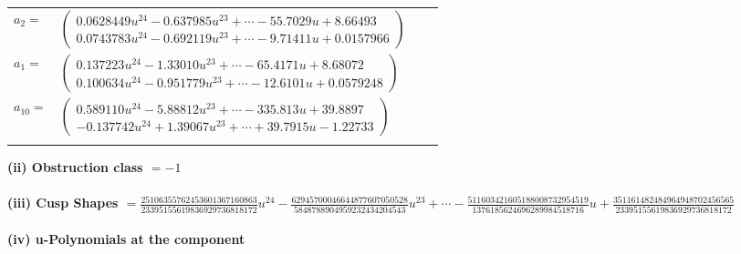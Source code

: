 \documentclass[1p]{elsarticle_modified}
\theoremstyle{definition}
\begin{document}
\begin{tabular}{m{7pt} m{180pt} m{7pt} m{180pt} }
\flushright $a_{2}=$&$\begin{pmatrix}0.0628449 u^{24}-0.637985 u^{23}+\cdots-55.7029 u+8.66493\\0.0743783 u^{24}-0.692119 u^{23}+\cdots-9.71411 u+0.0157966\end{pmatrix}$ \\
\flushright $a_{1}=$&$\begin{pmatrix}0.137223 u^{24}-1.33010 u^{23}+\cdots-65.4171 u+8.68072\\0.100634 u^{24}-0.951779 u^{23}+\cdots-12.6101 u+0.0579248\end{pmatrix}$ \\
\flushright $a_{10}=$&$\begin{pmatrix}0.589110 u^{24}-5.88812 u^{23}+\cdots-335.813 u+39.8897\\-0.137742 u^{24}+1.39067 u^{23}+\cdots+39.7915 u-1.22733\end{pmatrix}$\\&\end{tabular}
\flushleft \textbf{(ii) Obstruction class $= -1$}\\~\\
\flushleft \textbf{(iii) Cusp Shapes $= \frac{25106355762453601367160863}{23395155619836929736818172} u^{24}-\frac{62945700046644877607050528}{5848788904959232434204543} u^{23}+\cdots-\frac{511603421605188008732954519}{1376185624696289984518716} u+\frac{351161482484964948702456565}{23395155619836929736818172}$}\\~\\
\newpage\renewcommand{\arraystretch}{1}
\flushleft \textbf{(iv) u-Polynomials at the component}\newline \\
\end{document}

